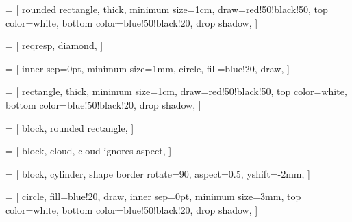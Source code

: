  = [
rounded rectangle,
thick,
minimum size=1cm,
draw=red!50!black!50,
top color=white,
bottom color=blue!50!black!20,
drop shadow,
]

 = [
reqresp,
diamond,
]

 = [
inner sep=0pt,
minimum size=1mm,
circle,
fill=blue!20,
draw,
]

 = [
rectangle,
thick,
minimum size=1cm,
draw=red!50!black!50,
top color=white,
bottom color=blue!50!black!20,
drop shadow,
]

 = [
block,
rounded rectangle,
]

 = [
block,
cloud,
cloud ignores aspect,
]

 = [
block,
cylinder,
shape border rotate=90,
aspect=0.5,
yshift=-2mm,
]


 = [
circle,
fill=blue!20,
draw,
inner sep=0pt,
minimum size=3mm,
top color=white,
bottom color=blue!50!black!20,
drop shadow,
]